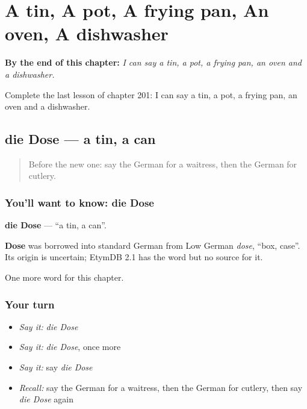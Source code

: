 
\chapter{A tin, A pot, A frying pan, An oven, A dishwasher}
\label{ch:ge-a-tin-a-pot-a-frying-pan-an-oven-a-dishwasher}

\begin{chapteropening}
\textbf{By the end of this chapter:} \emph{I can say a tin, a pot, a frying pan, an oven and a dishwasher.}

Complete the last lesson of chapter 201: I can say a tin, a pot, a frying pan, an oven and a dishwasher.
\end{chapteropening}

\section[die Dose]{die Dose — a tin, a can}

\label{lesson:GE-C201-dose}



\begin{quote}
Before the new one: say the German for a waitress, then the German for cutlery.
\end{quote}

\subsection*{You'll want to know: die Dose}
\textbf{die Dose} — \textquotedblleft{}a tin, a can\textquotedblright{}.

\begin{cousinweb}
\textbf{Dose} was borrowed into standard German from Low German \emph{dose}, \textquotedblleft{}box, case\textquotedblright{}. Its origin is uncertain; EtymDB 2.1 has the word but no source for it.
\end{cousinweb}

\begin{grammarlens}[title={What you've built}]
One more word for this chapter.
\end{grammarlens}

\subsection*{Your turn}
\begin{itemize}
\raggedright
  \item \emph{Say it:} \emph{die Dose}
  \item \emph{Say it:} \emph{die Dose}, once more
  \item \emph{Say it:} say \emph{die Dose}
  \item \emph{Recall:} say the German for a waitress, then the German for cutlery, then say \emph{die Dose} again
\end{itemize}

